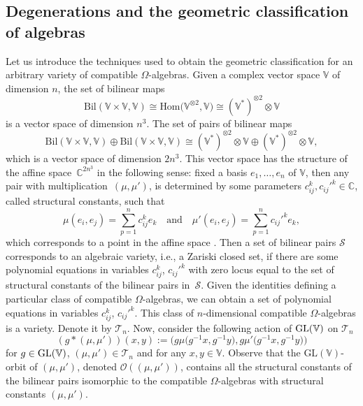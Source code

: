\documentclass[pdftex]{sigma}
\numberwithin{equation}{section}
\begin{document}
 \subsection{Degenerations and the geometric classification of algebras}
Let us introduce the techniques used to obtain the geometric classification for an arbitrary variety of compatible $\Omega$-algebras. Given a complex vector space ${\mathbb V}$ of dimension $n$, the set of bilinear maps
\[
\textrm{Bil}({\mathbb V} \times {\mathbb V}, {\mathbb V}) \cong \textrm{Hom}\bigl({\mathbb V} ^{\otimes2}, {\mathbb V}\bigr)\cong ({\mathbb V}^*)^{\otimes2} \otimes {\mathbb V}
\]
 is a vector space of dimension $n^3$. The set of pairs of bilinear maps %
\[
\textrm{Bil}({\mathbb V} \times {\mathbb V}, {\mathbb V}) \oplus \textrm{Bil}({\mathbb V}\times {\mathbb V}, {\mathbb V}) \cong ({\mathbb V}^*)^{\otimes2} \otimes {\mathbb V} \oplus ({\mathbb V}^*)^{\otimes2} \otimes {\mathbb V},
\]
 which is a vector space of dimension $2n^3$. This vector space has the structure of the affine space~$\mathbb{C}^{2n^3}$ in the following sense:
fixed a basis $e_1, \ldots, e_n$ of ${\mathbb V}$, then any pair with multiplication~$(\mu, \mu')$, is
determined by some parameters $c_{ij}^k, c_{ij}'^k \in \mathbb{C}$, called {structural constants}, such that
\[
\mu(e_i, e_j) = \sum_{p=1}^n c_{ij}^k e_k \quad \textrm{and}\quad \mu'(e_i, e_j) = \sum_{p=1}^n c_{ij}'^k e_k,
\]
which corresponds to a point in the affine space . Then a set of bilinear %
pairs $\mathcal S$ corresponds to an algebraic variety, i.e., a Zariski closed set, if there are some polynomial equations in variables $c_{ij}^k$, $c_{ij}'^k$ with zero locus equal to the set of structural constants of the bilinear pairs in~$\mathcal S$. Given the identities defining a particular class of compatible $\Omega$-algebras, we can obtain a set of polynomial equations in variables $c_{ij}^k$, $c_{ij}'^k$. This class of $n$-dimensional compatible $\Omega$-algebras is a variety. Denote it by $\mathcal{T}_{n}$. %
Now, consider the following action of $\rm{GL}({\mathbb V})$ on ${\mathcal T}_{n}$
\[
(g*(\mu, \mu'))(x,y) := \bigl(g \mu \bigl(g^{-1} x, g^{-1} y\bigr), g \mu' \bigl(g^{-1} x, g^{-1} y\bigr)\bigr)
\]
for $g\in\rm{GL}({\mathbb V})$, $(\mu, \mu')\in \mathcal{T}_{n}$ and for any $x, y \in {\mathbb V}$. Observe that the $\textrm{GL}({\mathbb V})$-orbit of $(\mu, \mu')$, denoted ${\mathcal O}((\mu, \mu'))$, contains all the structural constants of the bilinear pairs isomorphic to the compatible $\Omega$-algebras with structural constants $(\mu, \mu')$.
\end{document}
